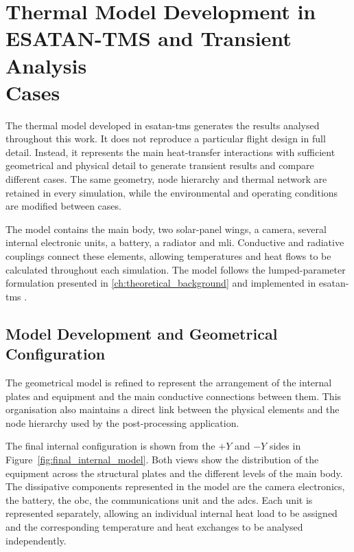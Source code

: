 \chapter[Thermal Model Development and Analysis Cases]
{Thermal Model Development in \\ ESATAN-TMS and Transient Analysis \\ Cases}
\label{ch:thermal_model}

The thermal model developed in \acrshort{esatan-tms} generates the results 
analysed throughout this work. It does not reproduce a particular flight 
design in full detail. Instead, it represents the main heat-transfer 
interactions with sufficient geometrical and physical detail to generate 
transient results and compare different cases. The same geometry, node 
hierarchy and thermal network are retained in every simulation, while the 
environmental and operating conditions are modified between cases.

The model contains the main body, two solar-panel wings, a camera, several 
internal electronic units, a battery, a radiator and \acrfull{mli}. Conductive 
and radiative couplings connect these elements, allowing temperatures and heat 
flows to be calculated throughout each simulation. The model follows the 
lumped-parameter formulation presented in 
\autoref{ch:theoretical_background} and implemented in 
\acrshort{esatan-tms} \cite{thermal_eng_man,esatan_user_man}.


\section{Model Development and Geometrical Configuration}
\label{sec:model_geometry}

The geometrical model is refined to represent the arrangement of the internal 
plates and equipment and the main conductive connections between them. This 
organisation also maintains a direct link between the physical elements and 
the node hierarchy used by the post-processing application.

The final internal configuration is shown from the $+Y$ and $-Y$ sides in 
Figure~\ref{fig:final_internal_model}. Both views show the 
distribution of the equipment across the structural plates and the different 
levels of the main body. The dissipative components represented in the model 
are the camera electronics, the battery, the \acrfull{obc}, the communications 
unit and the \acrfull{adcs}. Each unit is represented separately, allowing an 
individual internal heat load to be assigned and the corresponding temperature 
and heat exchanges to be analysed independently.

